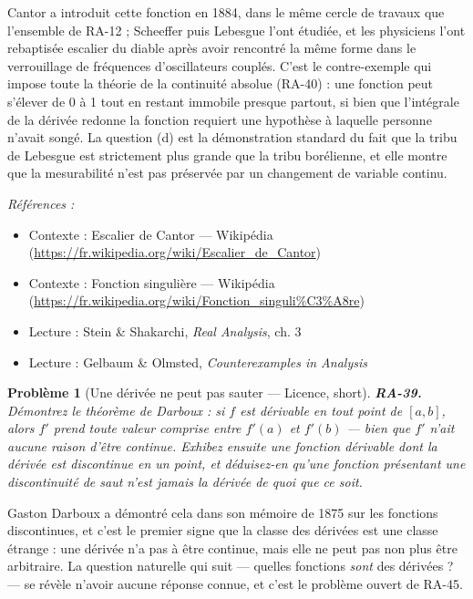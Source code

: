 \documentclass[11pt]{article}
\newtheorem{problem}{Problème}
\newenvironment{refs}{\par\small\noindent\emph{Références :}\begin{itemize}\setlength\itemsep{0pt}}{\end{itemize}\normalsize}
\begin{document}
\noindent Cantor a introduit cette fonction en 1884, dans le même cercle de travaux que
l'ensemble de RA-12 ; Scheeffer puis Lebesgue l'ont étudiée, et les physiciens l'ont rebaptisée
escalier du diable après avoir rencontré la même forme dans le verrouillage de fréquences
d'oscillateurs couplés. C'est le contre-exemple qui impose toute la théorie de la continuité absolue
(RA-40) : une fonction peut s'élever de 0 à 1 tout en restant immobile presque partout, si bien que
\og{} l'intégrale de la dérivée redonne la fonction \fg{} requiert une hypothèse à laquelle personne n'avait
songé. La question (d) est la démonstration standard du fait que la tribu de Lebesgue est
strictement plus grande que la tribu borélienne, et elle montre que la mesurabilité n'est pas
préservée par un changement de variable continu.

\begin{refs}
\item Contexte : Escalier de Cantor --- Wikipédia (\url{https://fr.wikipedia.org/wiki/Escalier_de_Cantor})
\item Contexte : Fonction singulière --- Wikipédia (\url{https://fr.wikipedia.org/wiki/Fonction_singuli%C3%A8re})
\item Lecture : Stein \& Shakarchi, \textit{Real Analysis}, ch. 3
\item Lecture : Gelbaum \& Olmsted, \textit{Counterexamples in Analysis}
\end{refs}

\bigskip

\begin{problem}[{Une dérivée ne peut pas sauter --- Licence, short}]
\textbf{RA-39.} Démontrez le théorème de Darboux : si $ f $ est dérivable
en tout point de $ [a,b] $, alors $ f' $ prend toute valeur comprise entre $ f'(a) $ et
$ f'(b) $ --- bien que $ f' $ n'ait aucune raison d'être continue. Exhibez ensuite une fonction
dérivable dont la dérivée est discontinue en un point, et déduisez-en qu'une fonction présentant une
discontinuité de saut n'est jamais la dérivée de quoi que ce soit.
\end{problem}

\noindent Gaston Darboux a démontré cela dans son mémoire de 1875 sur les fonctions
discontinues, et c'est le premier signe que la classe des dérivées est une classe étrange : une
dérivée n'a pas à être continue, mais elle ne peut pas non plus être arbitraire. La question
naturelle qui suit --- quelles fonctions \textit{sont} des dérivées ? --- se révèle n'avoir aucune réponse
connue, et c'est le problème ouvert de RA-45.
\end{document}

